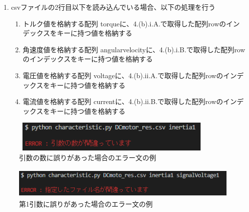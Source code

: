 \begin{enumerate}
\begin{enumerate}
        \item csvファイルの2行目以下を読み込んでいる場合、以下の処理を行う
        \begin{enumerate}
            \item トルク値を格納する配列 torqueに、4.(b).i.A.で取得した配列rowのインデックスをキーに持つ値を格納する
            \item 角速度値を格納する配列 angularvelocityに、4.(b).i.B.で取得した配列rowのインデックスをキーに持つ値を格納する
            \item 電圧値を格納する配列 voltageに、4.(b).ii.A.で取得した配列rowのインデックスをキーに持つ値を格納する
            \item 電流値を格納する配列 currentに、4.(b).ii.B.で取得した配列rowのインデックスをキーに持つ値を格納する
        \end{enumerate}
    \end{enumerate}

\end{enumerate}
\begin{figure}[t]
	\centering
	\includegraphics[width=10cm,height=1.5cm]{./Image/error_tarinai.png}
	\caption{引数の数に誤りがあった場合のエラー文の例}
	\label{fig:error_hikisuu}
\end{figure}
\begin{figure}[t]
	\centering
	\includegraphics[width=12cm,height=1.5cm]{./Image/error_file.png}
	\caption{第1引数に誤りがあった場合のエラー文の例}
	\label{fig:error_file}
\end{figure}
